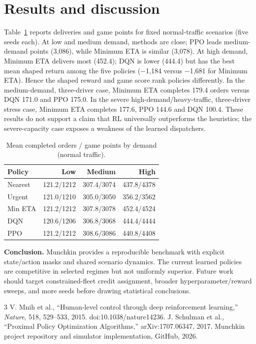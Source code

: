 \documentclass[9pt,twocolumn]{article}
\begin{document}
\section{Results and discussion}
Table~\ref{tab:main} reports deliveries and game points for fixed normal-traffic scenarios (five seeds each). At low and medium demand, methods are close; PPO leads medium-demand points (3,086), while Minimum ETA is similar (3,078). At high demand, Minimum ETA delivers most (452.4); DQN is lower (444.4) but has the best mean shaped return among the five policies (−1,184 versus −1,681 for Minimum ETA). Hence the shaped reward and game score rank policies differently. In the medium-demand, three-driver case, Minimum ETA completes 179.4 orders versus DQN 171.0 and PPO 175.0. In the severe high-demand/heavy-traffic, three-driver stress case, Minimum ETA completes 177.6, PPO 144.6 and DQN 100.4. These results do not support a claim that RL universally outperforms the heuristics; the severe-capacity case exposes a weakness of the learned dispatchers.
\begin{table}[h]\centering\small\caption{Mean completed orders / game points by demand (normal traffic).}\label{tab:main}\begin{tabular}{lrrr}\toprule Policy & Low & Medium & High\\\midrule Nearest &121.2/1212&307.4/3074&437.8/4378\\Urgent &121.0/1210&305.0/3050&356.2/3562\\Min ETA &121.2/1212&307.8/3078&452.4/4524\\DQN &120.6/1206&306.8/3068&444.4/4444\\PPO &121.2/1212&308.6/3086&440.8/4408\\\bottomrule\end{tabular}\end{table}
\textbf{Conclusion.} Munchkin provides a reproducible benchmark with explicit state/action masks and shared scenario dynamics. The current learned policies are competitive in selected regimes but not uniformly superior. Future work should target constrained-fleet credit assignment, broader hyperparameter/reward sweeps, and more seeds before drawing statistical conclusions.\vspace{-2mm}
\begin{thebibliography}{3}\scriptsize\setlength{\itemsep}{-2pt}
 V. Mnih et al., ``Human-level control through deep reinforcement learning,'' \emph{Nature}, 518, 529--533, 2015. doi:10.1038/nature14236.
 J. Schulman et al., ``Proximal Policy Optimization Algorithms,'' arXiv:1707.06347, 2017.
 Munchkin project repository and simulator implementation, GitHub, 2026.\end{thebibliography}
\end{document}
